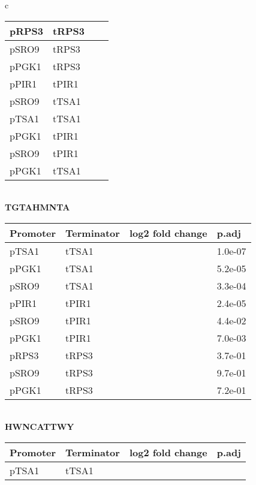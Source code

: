 \documentclass[../main.tex]{subfiles}
\begin{document}
\begin{table}[ph!]
{\begin{tabular}{c}
\begin{tabularx}{0.8\textwidth} { 
  | >{\centering\arraybackslash}X 
  | >{\centering\arraybackslash}X  
  | >{\centering\arraybackslash}X
  | >{\centering\arraybackslash}X | }
pRPS3 & tRPS3 & -0.4656481 & 0.0015\\
\hline
pSRO9 & tRPS3 & -0.3685185 & 0.0210\\
\hline
pPGK1 & tRPS3 & -0.1268519 & 0.3900\\
\hline
pPIR1 & tPIR1 & -0.0872287 & 0.2800\\
\hline
pSRO9 & tTSA1 & -0.0170833 & 0.9100\\
\hline
pTSA1 & tTSA1 & 0.0669444 & 0.6700\\
\hline
pPGK1 & tPIR1 & 0.0843282 & 0.1900\\
\hline
pSRO9 & tPIR1 & 0.1539836 & 0.0760\\
\hline
pPGK1 & tTSA1 & 0.3288889 & 0.0200\\
\hline
\end{tabularx} \\
\textbf{TGTAHMNTA} \\
\begin{tabularx}{0.8\textwidth} { 
  | >{\centering\arraybackslash}X 
  | >{\centering\arraybackslash}X  
  | >{\centering\arraybackslash}X
  | >{\centering\arraybackslash}X | }
\hline
\textbf{Promoter} & \textbf{Terminator} & \textbf{log2 fold change} & \textbf{p.adj}\\
\hline
pTSA1 & tTSA1 & -1.2986111 & 1.0e-07\\
\hline
pPGK1 & tTSA1 & -0.8977778 & 5.2e-05\\
\hline
pSRO9 & tTSA1 & -0.7969444 & 3.3e-04\\
\hline
pPIR1 & tPIR1 & -0.7679716 & 2.4e-05\\
\hline
pSRO9 & tPIR1 & -0.3607687 & 4.4e-02\\
\hline
pPGK1 & tPIR1 & -0.3570995 & 7.0e-03\\
\hline
pRPS3 & tRPS3 & -0.1788889 & 3.7e-01\\
\hline
pSRO9 & tRPS3 & -0.0075926 & 9.7e-01\\
\hline
pPGK1 & tRPS3 & 0.0798148 & 7.2e-01\\
\hline
\end{tabularx} \\
\textbf{HWNCATTWY} \\
\begin{tabularx}{0.8\textwidth} { 
  | >{\centering\arraybackslash}X 
  | >{\centering\arraybackslash}X  
  | >{\centering\arraybackslash}X
  | >{\centering\arraybackslash}X | }
\hline
\textbf{Promoter} & \textbf{Terminator} & \textbf{log2 fold change} & \textbf{p.adj}\\
\hline
pTSA1 & tTSA1 & -0.3393056 & 0.0013\\

\end{tabularx}
\end{tabular}}
\end{table}
\end{document}
